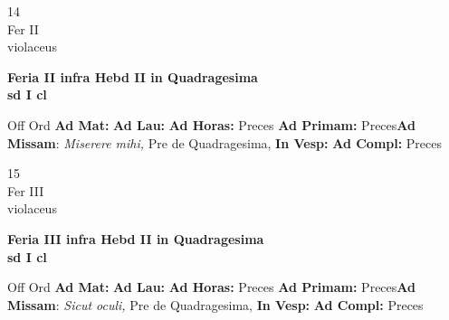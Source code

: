 \documentclass[10pt, openany]{book}
\begin{document}
    \begin{center}
        \begin{minipage}{3.5in}
            \vspace{2em}
            \begin{minipage}{0.5in}
                {\Huge 14} \\
                {\normalsize Fer II} \\
                {\normalsize violaceus}
            \end{minipage}
            \begin{minipage}{3.0in}
                \textbf{ \large Feria II infra Hebd II in Quadragesima \\
                \textnormal{\normalsize sd I cl}} \\ 
            \end{minipage}
            \begin{justify}Off Ord
                \textbf{Ad Mat: }
                \textbf{Ad Lau: }
                \textbf{Ad Horas: }Preces
                \textbf{Ad Primam: }Preces\textbf{Ad Missam}: \textit{Miserere mihi,} Pre de Quadragesima,  
                \textbf{In Vesp: }
                \textbf{Ad Compl: }Preces
            \end{justify}
        \end{minipage}
    \end{center}

    \begin{center}
        \begin{minipage}{3.5in}
            \vspace{2em}
            \begin{minipage}{0.5in}
                {\Huge 15} \\
                {\normalsize Fer III} \\
                {\normalsize violaceus}
            \end{minipage}
            \begin{minipage}{3.0in}
                \textbf{ \large Feria III infra Hebd II in Quadragesima \\
                \textnormal{\normalsize sd I cl}} \\ 
            \end{minipage}
            \begin{justify}Off Ord
                \textbf{Ad Mat: }
                \textbf{Ad Lau: }
                \textbf{Ad Horas: }Preces
                \textbf{Ad Primam: }Preces\textbf{Ad Missam}: \textit{Sicut oculi,} Pre de Quadragesima,  
                \textbf{In Vesp: }
                \textbf{Ad Compl: }Preces
            \end{justify}
        \end{minipage}
    \end{center}
\end{document}
